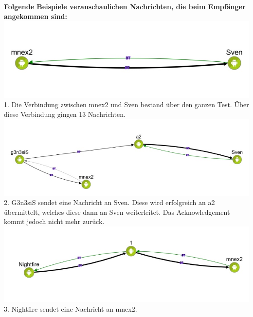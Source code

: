 \textbf{Folgende Beispiele veranschaulichen Nachrichten, die beim
Empfänger angekommen sind:}
\includegraphics[width=1.0\textwidth]{belege/grosstests/Bilder/Grosstest2/Test2Erfolg1.jpg}
1. Die Verbindung zwischen mnex2 und Sven bestand über den ganzen Test.
Über diese Verbindung gingen 13 Nachrichten.
\includegraphics[width=1.0\textwidth]{belege/grosstests/Bilder/Grosstest2/Test2Erfolg3.jpg}
2. G3n3siS sendet eine Nachricht an Sven. Diese wird erfolgreich an a2
übermittelt, welches diese dann an Sven weiterleitet. Das
Acknowledgement kommt jedoch nicht mehr zurück.
\includegraphics[width=1.0\textwidth]{belege/grosstests/Bilder/Grosstest2/Test2Erfolg4.jpg}
3. Nightfire sendet eine Nachricht an mnex2.

